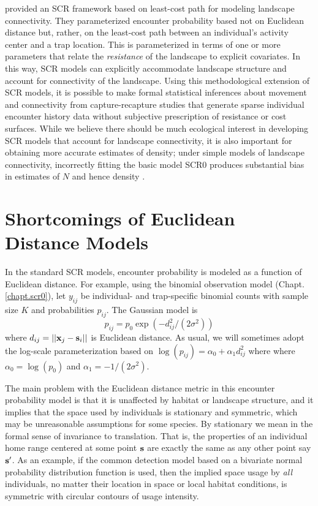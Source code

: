 \citet{royle_etal:2012ecol} provided an SCR
framework based on least-cost path for modeling landscape
connectivity. They parameterized encounter probability
based not on Euclidean distance but, rather,
on the least-cost path between an individual's activity center and a
trap location. This is parameterized in terms of one or more
parameters that relate the {\it resistance} of the landscape to
explicit covariates.  In this way, SCR models can explicitly accommodate
landscape structure and account for connectivity of the landscape.
Using this
methodological extension of SCR models, it is possible to make formal
statistical inferences about movement and connectivity from
capture-recapture studies that generate sparse individual encounter
history data without subjective prescription of resistance or cost
surfaces. %
While we believe there
should be much ecological interest in developing SCR models that
account for landscape connectivity, it is also important for obtaining
more accurate estimates of density; under simple models of landscape
connectivity, incorrectly fitting the basic model SCR0 produces
substantial bias in estimates of $N$ and hence density  \citep{royle_etal:2012ecol}.


\section{Shortcomings of Euclidean Distance Models}

In the standard SCR models, encounter probability is modeled as a
function of Euclidean distance. For example, using the binomial
observation model (Chapt. \ref{chapt.scr0}), let $y_{ij}$ be
individual- and trap-specific binomial counts with sample size $K$ and
probabilities $p_{ij}$. The Gaussian model is
\begin{equation}
p_{ij} = p_{0} \exp(-  d_{ij}^2 /(2\sigma^{2}) )
\label{ecoldist.eq.encounter}
\end{equation}
where $d_{ij} = ||{\bf x}_{j} - {\bf s}_{i}||$ is Euclidean
distance. As usual, we will sometimes adopt the log-scale
parameterization based on $\log(p_{ij})= \alpha_{0} + \alpha_{1}
d_{ij}^{2}$ where where $\alpha_{0} = \log(p_{0})$ and $\alpha_{1} =
-1/(2\sigma^2)$.

The main problem with the Euclidean distance metric in this encounter
probability model is that it is unaffected by habitat or landscape
structure, and it implies that the space used by individuals is
stationary and symmetric, which may be unreasonable assumptions for
some species. By stationary %
we mean in the formal sense of
invariance to translation. That is, the properties of an individual
home range centered at some point ${\bf s}$ are exactly the same as
any other point say ${\bf s}'$.  As an example, if the common
detection model based on a bivariate normal probability distribution
function is used, then the implied space usage by {\it all}
individuals, no matter their location in space or local habitat
conditions, is symmetric with circular contours of usage intensity.

